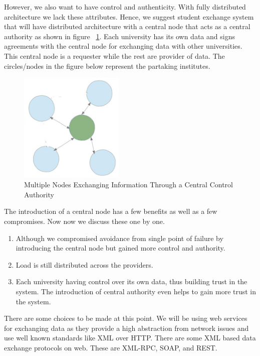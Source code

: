 \documentclass[12pt,a4paper,oneside]{book}
\begin{document}
However, we also want to have control and authenticity. With fully distributed architecture we lack these attributes. Hence, we suggest student exchange system that will have distributed architecture with a central node that acts as a central authority as shown in figure ~\ref{fig:architecture_distributed_exchange_through_hec}. Each university has its own data and signs agreements with the central node for exchanging data with other universities. This central node is a requester while the rest are provider of data. The circles/nodes in the figure below represent the partaking institutes. \\

\begin{figure}[!htp]
  \centering
  \includegraphics[width=5cm]{architecture_distributed_exchange_through_hec.png}
  \caption{Multiple Nodes Exchanging Information Through a Central Control Authority}
  \label{fig:architecture_distributed_exchange_through_hec}
\end{figure}

The introduction of a central node has a few benefits as well as a few compromises. Now now we discuss these one by one.

\begin{enumerate}
\item Although we compromised avoidance from single point of failure by introducing the central node but gained more control and authority. 
\item Load is still distributed across the providers.
\item Each university having control over its own data, thus building trust in the system. The introduction of central authority even helps to gain more trust in the system.
\end{enumerate}

There are some choices to be made at this point. We will be using web services for exchanging data as they provide a high abstraction from network issues and use well known standards like XML over HTTP. There are some XML based data exchange protocols on web. These are XML-RPC, SOAP, and REST. \\
\end{document}
